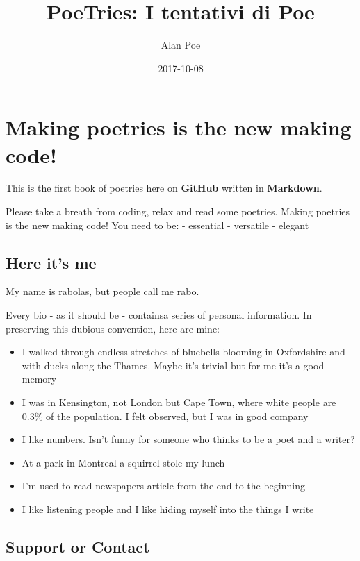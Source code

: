 \documentclass[]{book}
\title{PoeTries: I tentativi di Poe}
\author{Alan Poe}
\date{2017-10-08}
\providecommand{\tightlist}{%
  \setlength{\itemsep}{0pt}\setlength{\parskip}{0pt}}
\begin{document}
\maketitle

{
\setcounter{tocdepth}{1}
\tableofcontents
}
\chapter*{Making poetries is the new making
code!}\label{making-poetries-is-the-new-making-code}

This is the first book of poetries here on \textbf{GitHub} written in
\textbf{Markdown}.

Please take a breath from coding, relax and read some poetries. Making
poetries is the new making code! You need to be: - essential - versatile
- elegant

\section*{Here it's me}\label{here-its-me}

My name is rabolas, but people call me rabo.

Every bio - as it should be - containsa series of personal information.
In preserving this dubious convention, here are mine:

\begin{itemize}
\tightlist
\item
  I walked through endless stretches of bluebells blooming in
  Oxfordshire and with ducks along the Thames. Maybe it's trivial but
  for me it's a good memory
\item
  I was in Kensington, not London but Cape Town, where white people are
  0.3\% of the population. I felt observed, but I was in good company
\item
  I like numbers. Isn't funny for someone who thinks to be a poet and a
  writer?
\item
  At a park in Montreal a squirrel stole my lunch
\item
  I'm used to read newspapers article from the end to the beginning
\item
  I like listening people and I like hiding myself into the things I
  write
\end{itemize}

\section*{Support or Contact}\label{support-or-contact}
\end{document}
